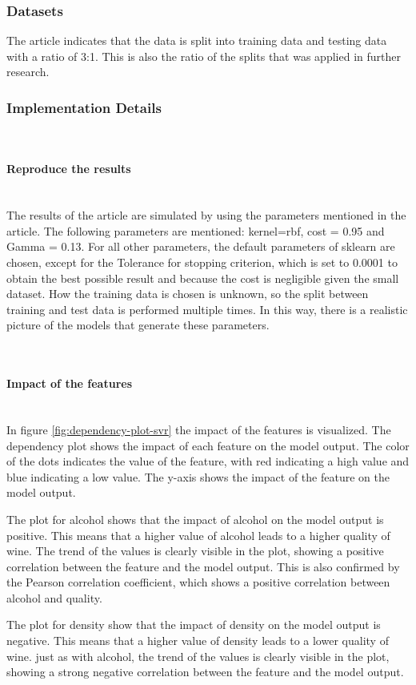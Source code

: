 \documentclass{article}
\newcommand{\subsubsubsection}[1]{%
  \paragraph{#1}\mbox{}\\}
\begin{document}
\subsubsection{Datasets}
The article indicates that the data is split into training data and testing data with a ratio of 3:1. This is also the ratio of the splits that was applied in further research.

\subsubsection{Implementation Details}

\subsubsubsection{Reproduce the results}
The results of the article are simulated by using the parameters mentioned in the article. The following parameters are mentioned: kernel=rbf, cost = 0.95 and Gamma = 0.13. For all other parameters, the default parameters of sklearn are chosen, except for the Tolerance for stopping criterion, which is set to 0.0001 to obtain the best possible result and because the cost is negligible given the small dataset.
How the training data is chosen is unknown, so the split between training and test data is performed multiple times. In this way, there is a realistic picture of the models that generate these parameters.

\subsubsubsection{Impact of the features}
In figure \autoref{fig:dependency-plot-svr}  the impact of the features is visualized.
The dependency plot shows the impact of each feature on the model output.
The color of the dots indicates the value of the feature, with red indicating a high value and blue indicating a low value.
The y-axis shows the impact of the feature on the model output.

The plot for alcohol shows that the impact of alcohol on the model output is positive.
This means that a higher value of alcohol leads to a higher quality of wine.
The trend of the values is clearly visible in the plot, showing a positive correlation between the feature and the model output.
This is also confirmed by the Pearson correlation coefficient, which shows a positive correlation between alcohol and quality.

The plot for density show that the impact of density on the model output is negative.
This means that a higher value of density leads to a lower quality of wine.
just as with alcohol, the trend of the values is clearly visible in the plot, showing a strong negative correlation between the feature and the model output.
\end{document}
